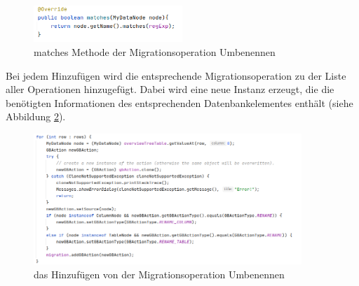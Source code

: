 \begin{figure}[h]
	\centering
	\includegraphics[width=0.5\textwidth]{images/ui/matches}
	\caption{matches Methode der Migrationsoperation Umbenennen}
	\label{img:ui:matches}
\end{figure}
Bei jedem Hinzufügen wird die entsprechende Migrationsoperation zu der Liste aller Operationen hinzugefügt. Dabei wird eine neue Instanz erzeugt, die die benötigten Informationen des entsprechenden Datenbankelementes enthält (siehe Abbildung \ref{img:ui:overviewAddRenameSrc}).
\begin{figure}[H]
	\centering
	\includegraphics[width=0.9\textwidth]{images/ui/overviewAddRenameSrc}
	\caption{das Hinzufügen von der Migrationsoperation Umbenennen}
	\label{img:ui:overviewAddRenameSrc}
\end{figure}
